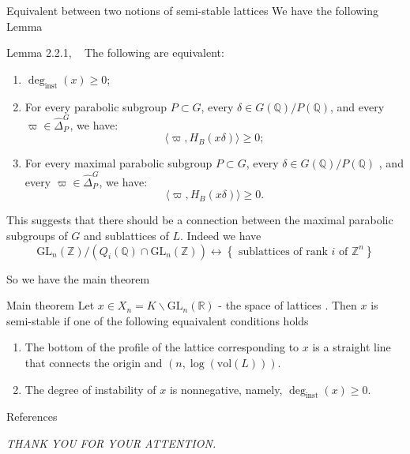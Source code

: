 \documentclass[pdf]{beamer}
\newcommand\Mycite[1]{%
  \citeauthor{#1}~}
\begin{document}
\begin{frame}{Equivalent between two notions of semi-stable lattices}
    We have the following Lemma
    \begin{block}{Lemma 2.2.1, \Mycite{chaudouard2016variante}}
        The following are equivalent:
        \begin{enumerate}
            \item \(\deg_{\text{inst}}(x) \geq 0\);
            \item For every parabolic subgroup \( P \subset G \), every \( \delta \in G(\mathbb{Q})/P(\mathbb{Q})\), and every \( \varpi \in \hat{\Delta}_P^G \), we have:
                  \[
                      \langle \varpi, H_B(x\delta ) \rangle \geq 0;
                  \]
            \item For every maximal parabolic subgroup \( P \subset G \), every \( \delta \in  G(\mathbb{Q})/P(\mathbb{Q})\) , and every \( \varpi \in \hat{\Delta}_P^G \), we have:
                  \[
                      \langle \varpi, H_B(x\delta ) \rangle \geq 0.
                  \]
        \end{enumerate}
    \end{block}
\end{frame}


\begin{frame}
    This suggests that there should be a connection between the maximal parabolic subgroups of $G$
    and sublattices of $L$. Indeed we have
    \[ \text{GL}_n(\mathbb{Z})/(Q_i(\mathbb{Q}) \cap \text{GL}_n(\mathbb{Z})) \longleftrightarrow \left\lbrace \text{ sublattices of rank $i$ of $\mathbb{Z}^n$}\right\rbrace\]

    So we have the main theorem
    \begin{block}{Main theorem}
        Let $x \in X_n = K \backslash \text{GL}_n(\mathbb{R})$ - the space of lattices . Then $x$ is semi-stable if one of the following equaivalent
        conditions holds
        \begin{enumerate}
            \item The bottom of the profile of the lattice corresponding to $x$ is a straight line that connects the origin and $(n,\log(\text{vol}(L)))$.
            \item The degree of instability of $x$ is nonnegative, namely, $\deg_{\text{inst}}(x) \ge 0$.
        \end{enumerate}
    \end{block}

\end{frame}
\begin{frame}{References}

\end{frame}

\begin{frame}
    \begin{center}
        \textit{THANK YOU FOR YOUR ATTENTION.}
    \end{center}
\end{frame}
\end{document}
